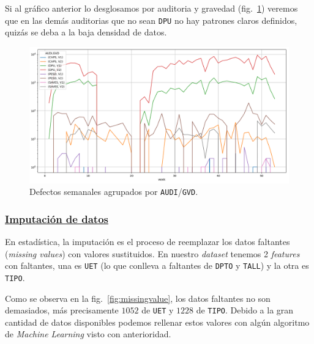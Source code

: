 \documentclass[a4paper,12pt]{article}
\begin{document}
Si al gráfico anterior lo desglosamos por auditoria y gravedad (fig.~\ref{fig:defectsperaudigvdweek}) veremos que en las demás auditorias que no sean \texttt{DPU} no hay patrones claros definidos, quizás se deba a la baja densidad de datos.

\begin{figure}[H]
	\begin{center}
	\includegraphics[width=1\textwidth]{audigvd.png}
  	\caption{Defectos semanales agrupados por \texttt{AUDI}/\texttt{GVD}.}
  	\label{fig:defectsperaudigvdweek}
  	\end{center}
\end{figure}

\subsubsection{\href{https://github.com/GeraCollante/tesis-icomp-machinelearning/blob/main/DataImputation.ipynb}{\color{blue}Imputación de datos}}
 
En estadística, la imputación es el proceso de reemplazar los datos faltantes (\textit{missing values}) con valores sustituidos. En nuestro \textit{dataset} tenemos 2 \textit{features} con faltantes, una es \texttt{UET} (lo que conlleva a faltantes de \texttt{DPTO} y \texttt{TALL}) y la otra es \texttt{TIPO}.

Como se observa en la fig.~\ref{fig:missingvalue}, los datos faltantes no son demasiados, más precisamente $1052$ de \texttt{UET} y $1228$ de \texttt{TIPO}. Debido a la gran cantidad de datos disponibles podemos rellenar estos valores con algún algoritmo de \textit{Machine Learning} visto con anterioridad.
\end{document}
